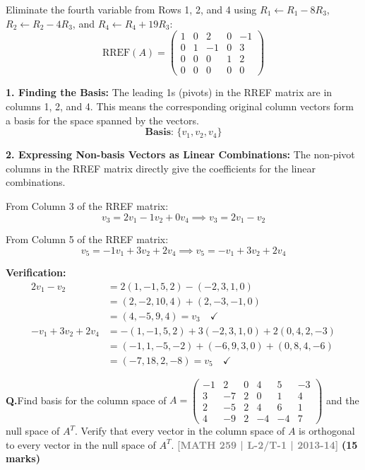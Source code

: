 \documentclass[12pt,a3paper]{article}
\newcommand{\yr}[1]{\hfill\textcolor{gray}{\small\textbf{[#1]}}}
\newcommand{\mk}[1]{\textcolor{orange!70!black}{\small\textbf{(#1 marks)}}}
\newcounter{qnum}
\newcommand{\Q}[1]{%
  \needspace{4\baselineskip}
  \refstepcounter{qnum}
  \vspace{6pt}
  \noindent\textbf{Q\theqnum.}\enspace #1\par
}
\begin{document}
\begin{tcolorbox}[enhanced,breakable,
  colback=cC!4,colframe=cC,boxrule=0.8pt,arc=5pt,
  title={\textbf{Answer --- Basis and Linear Combinations}},
  fonttitle=\bfseries\color{white},colbacktitle=cC]
Eliminate the fourth variable from Rows 1, 2, and 4 using $R_1 \leftarrow R_1 - 8R_3$, $R_2 \leftarrow R_2 - 4R_3$, and $R_4 \leftarrow R_4 + 19R_3$:
\[
\text{RREF}(A) = \begin{pmatrix}
1 & 0 & 2 & 0 & -1 \\
0 & 1 & -1 & 0 & 3 \\
0 & 0 & 0 & 1 & 2 \\
0 & 0 & 0 & 0 & 0
\end{pmatrix}
\]

\textbf{1. Finding the Basis:}
The leading 1s (pivots) in the RREF matrix are in columns 1, 2, and 4. This means the corresponding original column vectors form a basis for the space spanned by the vectors.
\[
\textbf{Basis: } \{v_1, v_2, v_4\}
\]

\textbf{2. Expressing Non-basis Vectors as Linear Combinations:}
The non-pivot columns in the RREF matrix directly give the coefficients for the linear combinations. 

From Column 3 of the RREF matrix:
\[
v_3 = 2v_1 - 1v_2 + 0v_4 \implies \boxed{v_3 = 2v_1 - v_2}
\]

From Column 5 of the RREF matrix:
\[
v_5 = -1v_1 + 3v_2 + 2v_4 \implies \boxed{v_5 = -v_1 + 3v_2 + 2v_4}
\]

\vspace{0.5cm}
\textbf{Verification:}
\begin{align*}
2v_1 - v_2 &= 2(1,-1,5,2) - (-2,3,1,0) \\
           &= (2,-2,10,4) + (2,-3,-1,0) \\
           &= (4,-5,9,4) = v_3 \quad \checkmark \\[1ex]
-v_1 + 3v_2 + 2v_4 &= -(1,-1,5,2) + 3(-2,3,1,0) + 2(0,4,2,-3) \\
                   &= (-1,1,-5,-2) + (-6,9,3,0) + (0,8,4,-6) \\
                   &= (-7,18,2,-8) = v_5 \quad \checkmark
\end{align*}

\end{tcolorbox}

\Q{Find basis for the column space of $A = \begin{pmatrix} -1 & 2 & 0 & 4 & 5 & -3 \\ 3 & -7 & 2 & 0 & 1 & 4 \\ 2 & -5 & 2 & 4 & 6 & 1 \\ 4 & -9 & 2 & -4 & -4 & 7 \end{pmatrix}$ and the null space of $A^T$. Verify that every vector in the column space of $A$ is orthogonal to every vector in the null space of $A^T$.
\yr{MATH 259 | L-2/T-1 | 2013-14} \mk{15}}
\end{document}
